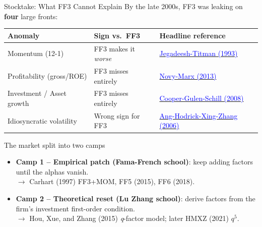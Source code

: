 \documentclass{beamer}
\begin{document}
\begin{frame}{Stocktake: What FF3 Cannot Explain}
	By the late 2000s, FF3 was leaking on \textbf{four} large fronts:
	\vspace{4pt}
	\begin{center}
		\small
		\begin{tabular}{@{}lll@{}}
			\toprule
			\textbf{Anomaly} & \textbf{Sign vs.\ FF3} & \textbf{Headline reference} \\
			\midrule
			Momentum (12-1) & FF3 makes it \textit{worse} & \href{https://doi.org/10.1111/j.1540-6261.1993.tb04702.x}{\textcolor{blue}{Jegadeesh-Titman (1993)}} \\
			Profitability (gross/ROE) & FF3 misses entirely & \href{https://doi.org/10.1016/j.jfineco.2013.01.003}{\textcolor{blue}{Novy-Marx (2013)}} \\
			Investment / Asset growth & FF3 misses entirely & \href{https://doi.org/10.1111/j.1540-6261.2008.01370.x}{\textcolor{blue}{Cooper-Gulen-Schill (2008)}} \\
			Idiosyncratic volatility & Wrong sign for FF3 & \href{https://doi.org/10.1111/j.1540-6261.2006.00836.x}{\textcolor{blue}{Ang-Hodrick-Xing-Zhang (2006)}} \\
			\bottomrule
		\end{tabular}
	\end{center}
	\vspace{6pt}
	\begin{block}{The market split into two camps}
		\begin{itemize}
			\item \textbf{Camp 1 -- Empirical patch (Fama-French school)}: keep adding factors until the alphas vanish. \\
			$\rightarrow$ Carhart (1997) FF3+MOM, FF5 (2015), FF6 (2018).
			\item \textbf{Camp 2 -- Theoretical reset (Lu Zhang school)}: derive factors from the firm's investment first-order condition. \\
			$\rightarrow$ Hou, Xue, and Zhang (2015) \textit{q}-factor model; later HMXZ (2021) $q^5$.
		\end{itemize}
	\end{block}
\end{frame}
\end{document}
